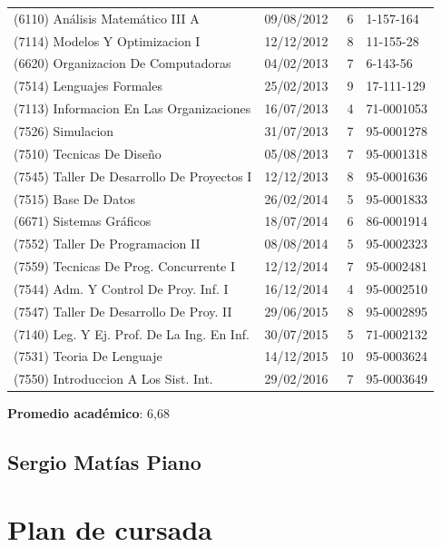 \documentclass[a4paper,11pt]{article}
\begin{document}
\begin{longtable}{|l|l|r|l|}
  (6110) Análisis Matemático III A           & 09/08/2012 & 6  & 1-157-164         \\
  (7114) Modelos Y Optimizacion I            & 12/12/2012 & 8  & 11-155-28         \\
  (6620) Organizacion De Computadoras        & 04/02/2013 & 7  & 6-143-56          \\
  (7514) Lenguajes Formales                  & 25/02/2013 & 9  & 17-111-129        \\
  (7113) Informacion En Las Organizaciones   & 16/07/2013 & 4  & 71-0001053        \\
  (7526) Simulacion                          & 31/07/2013 & 7  & 95-0001278        \\
  (7510) Tecnicas De Diseño                  & 05/08/2013 & 7  & 95-0001318        \\
  (7545) Taller De Desarrollo De Proyectos I & 12/12/2013 & 8  & 95-0001636        \\
  (7515) Base De Datos                       & 26/02/2014 & 5  & 95-0001833        \\
  (6671) Sistemas Gráficos                   & 18/07/2014 & 6  & 86-0001914        \\
  (7552) Taller De Programacion II           & 08/08/2014 & 5  & 95-0002323        \\
  (7559) Tecnicas De Prog. Concurrente I     & 12/12/2014 & 7  & 95-0002481        \\
  (7544) Adm. Y Control De Proy. Inf. I      & 16/12/2014 & 4  & 95-0002510        \\
  (7547) Taller De Desarrollo De Proy. II    & 29/06/2015 & 8  & 95-0002895        \\
  (7140) Leg. Y Ej. Prof. De La Ing. En Inf. & 30/07/2015 & 5  & 71-0002132        \\
  (7531) Teoria De Lenguaje                  & 14/12/2015 & 10 & 95-0003624        \\
  (7550) Introduccion A Los Sist. Int.       & 29/02/2016 & 7  & 95-0003649        \\
  \hline
\end{longtable}

\textbf{Promedio académico}: 6,68

\subsection{Sergio Matías Piano}

\section{Plan de cursada}
\end{document}
